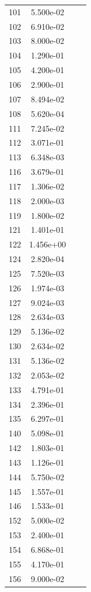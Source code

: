 \documentclass[12pt]{article}
\begin{document}
\begin{longtable}{@{}cccc@{}}
101 & 5.500e-02 &  &  \\
102 & 6.910e-02 &  &  \\
103 & 8.000e-02 &  &  \\
104 & 1.290e-01 &  &  \\
105 & 4.200e-01 &  &  \\
106 & 2.900e-01 &  &  \\
107 & 8.494e-02 &  &  \\
108 & 5.620e-04 &  &  \\
111 & 7.245e-02 &  &  \\
112 & 3.071e-01 &  &  \\
113 & 6.348e-03 &  &  \\
116 & 3.679e-01 &  &  \\
117 & 1.306e-02 &  &  \\
118 & 2.000e-03 &  &  \\
119 & 1.800e-02 &  &  \\
121 & 1.401e-01 &  &  \\
122 & 1.456e+00 &  &  \\
124 & 2.820e-04 &  &  \\
125 & 7.520e-03 &  &  \\
126 & 1.974e-03 &  &  \\
127 & 9.024e-03 &  &  \\
128 & 2.634e-03 &  &  \\
129 & 5.136e-02 &  &  \\
130 & 2.634e-02 &  &  \\
131 & 5.136e-02 &  &  \\
132 & 2.053e-02 &  &  \\
133 & 4.791e-01 &  &  \\
134 & 2.396e-01 &  &  \\
135 & 6.297e-01 &  &  \\
140 & 5.098e-01 &  &  \\
142 & 1.803e-01 &  &  \\
143 & 1.126e-01 &  &  \\
144 & 5.750e-02 &  &  \\
145 & 1.557e-01 &  &  \\
146 & 1.533e-01 &  &  \\
152 & 5.000e-02 &  &  \\
153 & 2.400e-01 &  &  \\
154 & 6.868e-01 &  &  \\
155 & 4.170e-01 &  &  \\
156 & 9.000e-02 &  &  \\

\end{longtable}
\end{document}
